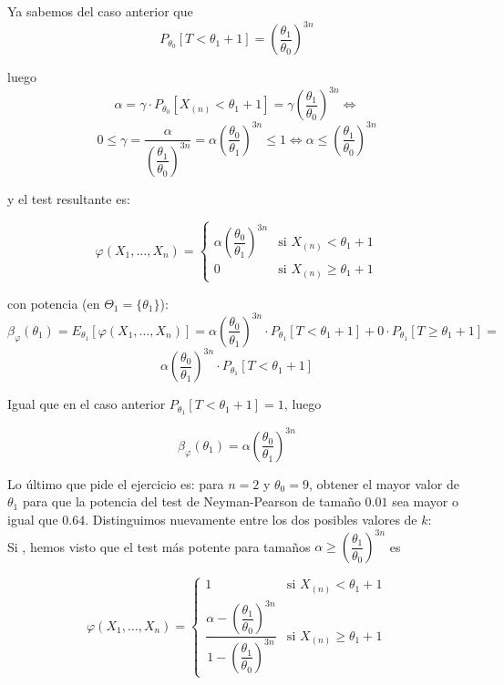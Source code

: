\documentclass[12pt]{article}
\begin{document}
\begin{ejercicio}[2 puntos]
        Ya sabemos del caso anterior que 
        $$P_{\theta_0}[T < \theta_1 + 1] = \left( \dfrac{\theta_1}{\theta_0} \right)^{3n}$$

        luego
        $$\alpha = \gamma \cdot P_{\theta_0}[X_{(n)} < \theta_1 + 1] = \gamma \left( \dfrac{\theta_1}{\theta_0} \right)^{3n} \iff $$
        $$0 \leq \gamma = \dfrac{\alpha}{\left( \dfrac{\theta_1}{\theta_0} \right)^{3n}} = \alpha \left( \dfrac{\theta_0}{\theta_1} \right)^{3n}  \leq 1 \iff \alpha \leq \left( \dfrac{\theta_1}{\theta_0} \right)^{3n}$$

        y el test resultante es:

        $$\varphi(X_1, \ldots, X_n) = 
            \begin{cases}
                \alpha \left( \dfrac{\theta_0}{\theta_1} \right)^{3n} &\text{si } X_{(n)} < \theta_1 + 1 \\
                0 &\text{si } X_{(n)} \geq \theta_1 + 1
            \end{cases}$$      
            
        con potencia (en $\Theta_1 = \{\theta_1\}$):
        $$\beta_{\varphi}(\theta_1) = E_{\theta_1}[\varphi(X_1, \ldots, X_n)] = \alpha \left( \dfrac{\theta_0}{\theta_1} \right)^{3n} \cdot P_{\theta_1}[T < \theta_1 + 1] + 
        0 \cdot P_{\theta_1}[T \geq \theta_1 + 1] = $$
        $$\alpha \left( \dfrac{\theta_0}{\theta_1} \right)^{3n} \cdot P_{\theta_1}[T < \theta_1 + 1]$$

        Igual que en el caso anterior $P_{\theta_1}[T < \theta_1 + 1] = 1$, luego

        $$\beta_{\varphi}(\theta_1) = \alpha \left( \dfrac{\theta_0}{\theta_1} \right)^{3n}$$

        Lo último que pide el ejercicio es: para $n=2$ y $\theta_0=9$, obtener el mayor valor de $\theta_1$ para que la potencia del test de Neyman-Pearson de tamaño $0.01$ sea mayor o igual que $0.64$. Distinguimos nuevamente
        entre los dos posibles valores de $k$: \\

        Si , hemos visto que el test más potente para tamaños $\alpha \geq \left( \dfrac{\theta_1}{\theta_0} \right)^{3n}$ es

        $$\varphi(X_1, \ldots, X_n) = 
            \begin{cases}
                1 &\text{si } X_{(n)} < \theta_1 + 1 \\
                \dfrac{\alpha - \left( \dfrac{\theta_1}{\theta_0} \right)^{3n}}{1 - \left( \dfrac{\theta_1}{\theta_0} \right)^{3n}} &\text{si } X_{(n)} \geq \theta_1 + 1
            \end{cases}$$  


\end{ejercicio}
\end{document}
